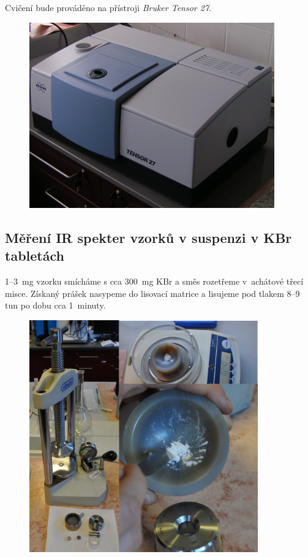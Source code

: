 \documentclass[12pt]{article}
\begin{document}
Cvičení bude prováděno na přístroji \textit{Bruker Tensor 27}.

\begin{figure}[H]
	\centering
	\includegraphics[keepaspectratio,height=8cm]{img/tensor.jpg}
\end{figure}

\subsection{Měření IR spekter vzorků v suspenzi v KBr tabletách}
	1--3~mg vzorku smícháme s cca 300~mg KBr a směs rozetřeme v~achátové třecí misce. Získaný prášek nasypeme do lisovací matrice a lisujeme pod tlakem 8--9 tun po dobu cca 1~minuty.

\begin{figure}[H]
	\centering
	\includegraphics[keepaspectratio,height=10cm]{img/KBr.png}
\end{figure}
\end{document}
